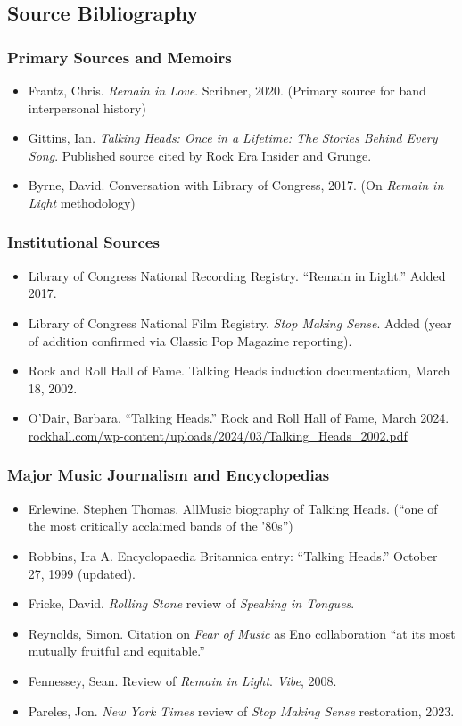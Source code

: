 \documentclass[11pt,letterpaper]{article}
\begin{document}
\subsection{Source Bibliography}

\subsubsection{Primary Sources and Memoirs}
\begin{itemize}[leftmargin=*]
  \item Frantz, Chris. \textit{Remain in Love}. Scribner, 2020. (Primary source for band interpersonal history)
  \item Gittins, Ian. \textit{Talking Heads: Once in a Lifetime: The Stories Behind Every Song}. Published source cited by Rock Era Insider and Grunge.
  \item Byrne, David. Conversation with Library of Congress, 2017. (On \textit{Remain in Light} methodology)
\end{itemize}

\subsubsection{Institutional Sources}
\begin{itemize}[leftmargin=*]
  \item Library of Congress National Recording Registry. ``Remain in Light.'' Added 2017.
  \item Library of Congress National Film Registry. \textit{Stop Making Sense}. Added (year of addition confirmed via Classic Pop Magazine reporting).
  \item Rock and Roll Hall of Fame. Talking Heads induction documentation, March 18, 2002.
  \item O'Dair, Barbara. ``Talking Heads.'' Rock and Roll Hall of Fame, March 2024. \url{rockhall.com/wp-content/uploads/2024/03/Talking_Heads_2002.pdf}
\end{itemize}

\subsubsection{Major Music Journalism and Encyclopedias}
\begin{itemize}[leftmargin=*]
  \item Erlewine, Stephen Thomas. AllMusic biography of Talking Heads. (``one of the most critically acclaimed bands of the '80s'')
  \item Robbins, Ira A. Encyclopaedia Britannica entry: ``Talking Heads.'' October 27, 1999 (updated).
  \item Fricke, David. \textit{Rolling Stone} review of \textit{Speaking in Tongues}.
  \item Reynolds, Simon. Citation on \textit{Fear of Music} as Eno collaboration ``at its most mutually fruitful and equitable.''
  \item Fennessey, Sean. Review of \textit{Remain in Light}. \textit{Vibe}, 2008.
  \item Pareles, Jon. \textit{New York Times} review of \textit{Stop Making Sense} restoration, 2023.
\end{itemize}
\end{document}

